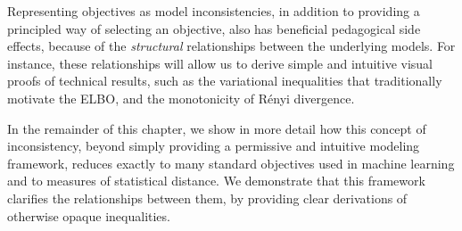 Representing objectives as model inconsistencies, in addition to providing a principled way of selecting an objective, also has beneficial pedagogical side effects, because of the \emph{structural} relationships between the underlying models.
For instance, these relationships will allow us to derive
simple and intuitive visual proofs of technical results,
such as the variational inequalities that traditionally motivate the ELBO,
and the monotonicity of R\'enyi divergence.



In the remainder of this chapter, we show in more detail how this concept of inconsistency, beyond simply providing a permissive and intuitive modeling framework, reduces exactly to many standard objectives used in machine learning and to measures of statistical distance.
 We demonstrate that this framework clarifies the relationships between them, by providing clear derivations of otherwise opaque inequalities.




